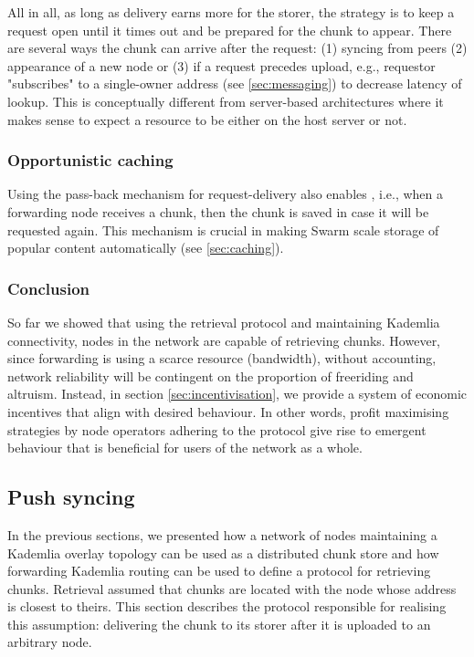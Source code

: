 All in all, as long as delivery earns more for the storer, the strategy is to keep a request open until it times out and be prepared for the chunk to appear. There are several ways the chunk can arrive after the request: (1) syncing from peers (2) appearance of a new node or (3) if a request precedes upload, e.g., requestor "subscribes" to a single-owner address (see \ref{sec:messaging}) to  decrease latency of lookup. This is conceptually different from server-based architectures where it makes sense to expect a resource to be either on the host server or not. 
 

\subsubsection{Opportunistic caching}

Using the pass-back mechanism for request-delivery also enables , i.e., when a forwarding node receives a chunk, then the chunk is saved in case it will be requested again. This mechanism is crucial in making Swarm scale storage of popular content automatically (see \ref{sec:caching}).

\subsubsection{Conclusion}

So far we showed that using the retrieval protocol and maintaining Kademlia connectivity, nodes in the network are capable of retrieving chunks. However, since forwarding is using a scarce resource (bandwidth), without accounting, network reliability will be contingent on the proportion of freeriding and altruism. Instead, in section \ref{sec:incentivisation}, we provide a system of economic incentives that align with desired behaviour. In other words, profit maximising strategies by node operators adhering to the protocol give rise to emergent behaviour that is beneficial for users of the network as a whole.
 
\subsection{Push syncing}\label{sec:push-syncing}
 
In the previous sections, we presented how a network of nodes maintaining a Kademlia overlay topology can be used as a distributed chunk store and how forwarding Kademlia routing can be used to define a  protocol for retrieving chunks.
Retrieval assumed that chunks are located with the node whose address is closest to theirs. This section describes the protocol responsible for realising this assumption: delivering the chunk to its storer after it is uploaded to an arbitrary node.


